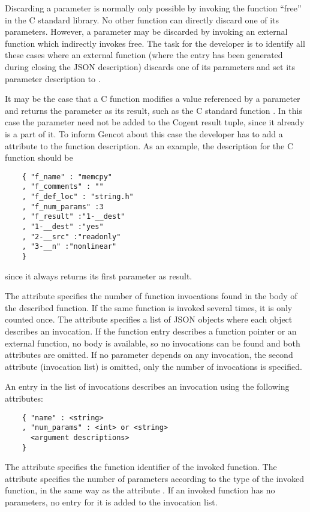 Discarding a parameter is normally only possible by invoking the function ``free'' in the C standard library. No other function
can directly discard one of its parameters. However, a parameter may be discarded by invoking an external function which indirectly
invokes free. The task for the developer is to identify all these cases where an external function (where the entry has been
generated during closing the JSON description) discards one of its parameters and set its parameter description to .

It may be the case that a C function modifies a value referenced by a parameter and returns the parameter as its result, such as 
the C standard function . In this case the parameter need not be added to the Cogent result tuple, since it already
is a part of it. To inform Gencot about this case the developer has to add a  attribute to the function
description. As an example, the description for the C function  should be
\begin{verbatim}
    { "f_name" : "memcpy"
    , "f_comments" : ""
    , "f_def_loc" : "string.h"
    , "f_num_params" :3
    , "f_result" :"1-__dest"
    , "1-__dest" :"yes" 
    , "2-__src" :"readonly" 
    , "3-__n" :"nonlinear" 
    }
\end{verbatim}
since it always returns its first parameter as result.

The attribute  specifies the number of function invocations found in the body of the described function.
If the same function is invoked several times, it is only counted once. The attribute  specifies a list
of JSON objects where each object describes an invocation. If the function entry describes a function pointer or an external
function, no body is available, so no invocations can be found and both attributes are omitted. If no parameter depends on
any invocation, the second attribute (invocation list) is omitted, only the number of invocations is specified.

An entry in the list of invocations describes an invocation using the following attributes:
\begin{verbatim}
    { "name" : <string> 
    , "num_params" : <int> or <string>
      <argument descriptions>
    }
\end{verbatim}

The attribute  specifies the function identifier of the invoked function. The attribute 
specifies the number of parameters according to the type of the invoked function, in the same way as the attribute
. If an invoked function has no parameters, no entry for it is added to the invocation list.


